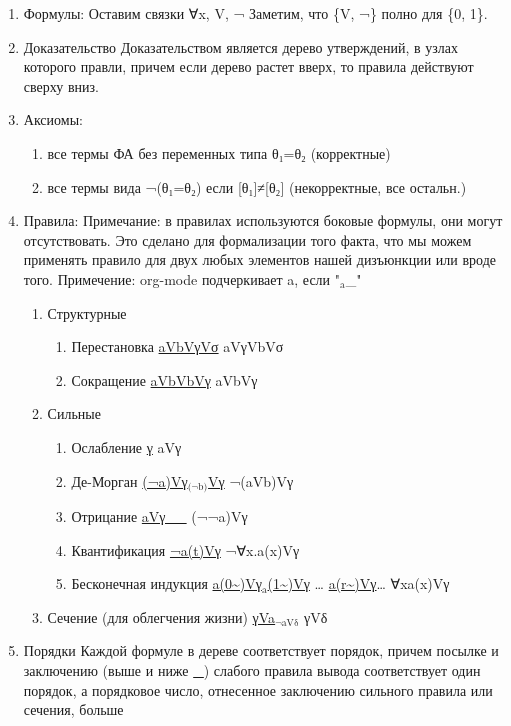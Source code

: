 \documentclass[11pt]{article}
\begin{document}
\begin{enumerate}
\item Формулы:
Оставим связки ∀x, V, ¬
Заметим, что \{V, ¬\} полно для \{0, 1\}.
\item Доказательство
Доказательством является дерево утверждений, в
узлах которого правли, причем если дерево
растет вверх, то правила действуют сверху вниз.
\item Аксиомы:
\begin{enumerate}
\item все термы ФА без переменных типа θ₁=θ₂ (корректные)
\item все термы вида ¬(θ₁=θ₂) если [θ₁]≠[θ₂] (некорректные, все остальн.)
\end{enumerate}
\item Правила:
Примечание: в правилах используются боковые формулы,
они могут отсутствовать. Это сделано для формализации
того факта, что мы можем применять правило для двух любых
элементов нашей дизъюнкции или вроде того.
Примечение: org-mode подчеркивает a, если "$_{\text{a}}$\_"
\begin{enumerate}
\item Структурные
\begin{enumerate}
\item Перестановка
\uline{aVbVγVσ}
aVγVbVσ
\item Сокращение
\uline{aVbVbVγ}
aVbVγ
\end{enumerate}
\item Сильные
\begin{enumerate}
\item Ослабление
\uline{γ}
aVγ
\item Де-Морган
\uline{(¬a)Vγ$_{\text{(¬b)}}$Vγ}
¬(aVb)Vγ
\item Отрицание
\uline{aVγ\_\_}
(¬¬a)Vγ
\item Квантификация
\uline{¬a(t)Vγ}
¬∀x.a(x)Vγ
\item Бесконечная индукция
\uline{a(0\textasciitilde{})Vγ$_{\text{a}}$(1\textasciitilde{})Vγ} \ldots{} \uline{a(r\textasciitilde{})Vγ}\ldots{}
∀xa(x)Vγ
\end{enumerate}
\item Сечение (для облегчения жизни)
\uline{γVa$_{\text{¬aVδ}}$}
γVδ
\end{enumerate}
\item Порядки
Каждой формуле в дереве соответствует порядок, причем
посылке и заключению (выше и ниже \uline{\_}) слабого правила
вывода соответствует один порядок, а порядковое число,
отнесенное заключению сильного правила или сечения, больше

\end{enumerate}
\end{document}
